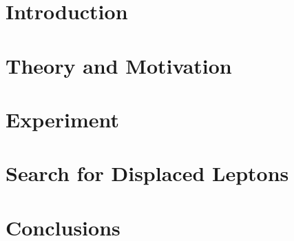 \cleardoublepage %



\part{Introduction}


\cleardoublepage

\ctparttext{}
\part{Theory and Motivation}




\cleardoublepage 

\ctparttext{}
\part{Experiment}






\cleardoublepage 

\ctparttext{}
\part{Search for Displaced Leptons}







\cleardoublepage 

\ctparttext{}
\part{Conclusions}


